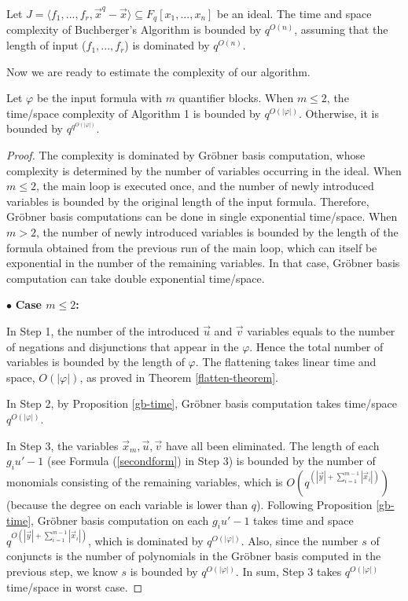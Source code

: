\documentclass[envcountsect]{llncs}
\begin{document}
{{\begin{proposition}\label{gb-time}
Let $J=\langle f_1,...,f_r, \vec x^q-\vec x\rangle\subseteq F_q[x_1,...,x_n]$ be an ideal. The time and space complexity of Buchberger's Algorithm is bounded by $q^{O(n)}$, assuming that the length of input ($f_1,...,f_r$) is dominated by $q^{O(n)}$.
\end{proposition}

Now we are ready to estimate the complexity of our algorithm.

\begin{theorem}[Complexity]\label{complexity}
Let $\varphi$ be the input formula with $m$ quantifier blocks. When $m\leq 2$, the time/space complexity of Algorithm 1 is bounded by $q^{O(|\varphi|)}$. Otherwise, it is bounded by $q^{q^{O(|\varphi|)}}$.
\end{theorem}
\begin{proof}
The complexity is dominated by Gr\"obner basis computation, whose complexity is determined by the number of variables occurring in the ideal. When $m\leq 2$, the main loop is executed once, and the number of newly introduced variables is bounded by the original length of the input formula. Therefore, Gr\"obner basis computations can be done in single exponential time/space. When $m>2$, the number of newly introduced variables is bounded by the length of the formula obtained from the previous run of the main loop, which can itself be exponential in the number of the remaining variables.  In that case, Gr\"obner basis computation can take double exponential time/space. 

$\bullet$ {\bf Case $m\leq 2$:}

In Step 1, the number of the introduced $\vec u$ and $\vec v$ variables equals to the number of negations and disjunctions that appear in the $\varphi$. Hence the total number of variables is bounded by the length of $\varphi$. The flattening takes linear time and space, $O(|\varphi|)$, as proved in Theorem \ref{flatten-theorem}.

In Step 2, by Proposition \ref{gb-time}, Gr\"obner basis computation takes time/space $q^{O(|\varphi|)}$. 

In Step 3, the variables $\vec x_m, \vec u, \vec v$ have all been eliminated. The length of each $g_iu'-1$ (see Formula (\ref{secondform}) in Step 3) is bounded by the number of monomials consisting of the remaining variables, which is $O(q^{(|\vec y|+\sum_{i=1}^{m-1}|\vec x_i|)})$ (because the degree on each variable is lower than $q$). Following Proposition \ref{gb-time}, Gr\"obner basis computation on each $g_iu'-1$ takes time and space $q^{O(|\vec y|+\sum_{i=1}^{m-1}|\vec x_i|)}$, which is dominated by $q^{O(|\varphi|)}$. Also, since the number $s$ of conjuncts is the number of polynomials in the Gr\"obner basis computed in the previous step, we know $s$ is bounded by $q^{O(|\varphi|)}$. In sum, Step 3 takes $q^{O(|\varphi|)}$ time/space in worst case.


\end{proof}}}
\end{document}
